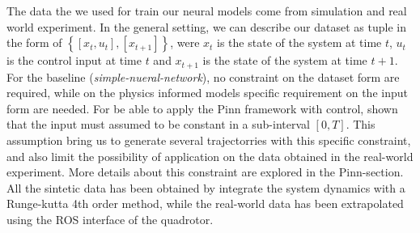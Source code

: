 The data the we used for train our neural models come from simulation and real world experiment. 
In the general setting, we can describe our dataset as tuple in the form of $\left\{[x_{t}, u_{t}], [x_{t+1}]\right\}$, 
were $x_{t}$ is the state of the system at time $t$, $u_{t}$ is the control input at time $t$ and $x_{t+1}$ is the state of the system at time $t+1$.
\\

For the baseline (\textit{simple-nueral-network}), no constraint on the dataset form are required, while on the physics informed models specific requirement on the
input form are needed. For be able to apply the Pinn framework with control, \cite{Antonelo_2024} shown that the input must 
assumed to be constant in a sub-interval $[0, T]$. 
This assumption bring us to generate several trajectorries with this specific constraint, and also limit the 
possibility of application on the data obtained in the real-world experiment. More details about this constraint are explored in the Pinn-section.
\\

All the sintetic data has been obtained by integrate the system dynamics with a Runge-kutta 4th order method, while the real-world data has been extrapolated 
using the ROS interface of the quadrotor.

